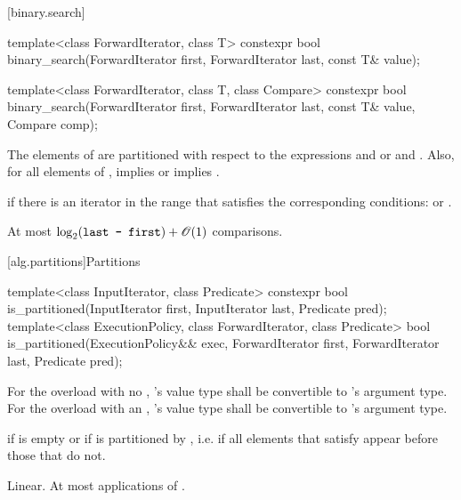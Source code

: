 [binary.search]{}

%
\begin{itemdecl}
template<class ForwardIterator, class T>
  constexpr bool
    binary_search(ForwardIterator first, ForwardIterator last,
                  const T& value);

template<class ForwardIterator, class T, class Compare>
  constexpr bool
    binary_search(ForwardIterator first, ForwardIterator last,
                  const T& value, Compare comp);
\end{itemdecl}

\begin{itemdescr}
\pnum
\requires
The elements
of
are partitioned with respect to the expressions
and
or
and
.
Also, for all elements
of
\tcode{[first, last)},
implies
or
implies
.

\pnum
\returns
{}
if there is an iterator
in the range
that satisfies the corresponding conditions:
or
.

\pnum
\complexity
At most
$\log_2(\texttt{last - first}) + \mathscr{O}(1)$
comparisons.
\end{itemdescr}

[alg.partitions]{Partitions}

%
\begin{itemdecl}
template<class InputIterator, class Predicate>
  constexpr bool is_partitioned(InputIterator first, InputIterator last, Predicate pred);
template<class ExecutionPolicy, class ForwardIterator, class Predicate>
  bool is_partitioned(ExecutionPolicy&& exec,
                      ForwardIterator first, ForwardIterator last, Predicate pred);
\end{itemdecl}

\begin{itemdescr}
\pnum
\requires For the overload with no ,
's value type shall be convertible to 's
argument type.  For the overload with an ,
's value type shall be convertible to 's
argument type.

\pnum
\returns {} if
 is empty or if
 is partitioned by , i.e. if all elements that satisfy  appear before those that do not.

\pnum
\complexity Linear. At most  applications of .
\end{itemdescr}

